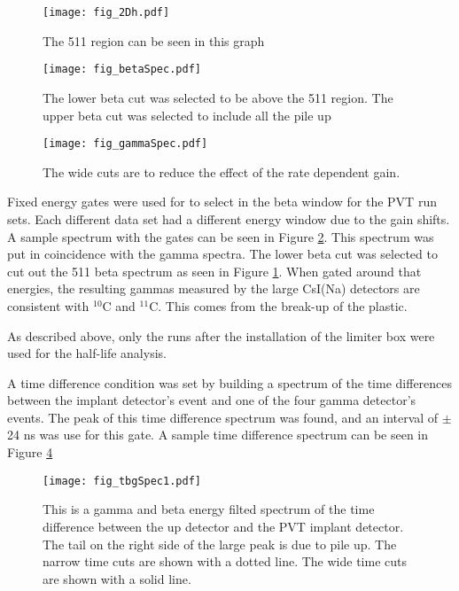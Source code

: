 \begin{figure}[!htb]
	\centerline{\texttt{[image: fig\_2Dh.pdf]}}
	\caption{The 511 region can be seen in this graph}
	\label{fig:2DGraph}
\end{figure}

\begin{figure}[!htb]
	\centerline{\texttt{[image: fig\_betaSpec.pdf]}}
	\caption{The lower beta cut was selected to be above the 511 region.
		 The upper beta cut was selected to include all the pile up}
	
	\label{fig:BetaGraph}
\end{figure}

\begin{figure}[!htb]
	\centerline{\texttt{[image: fig\_gammaSpec.pdf]}}
	\caption{The wide cuts are to reduce the effect of the rate dependent gain.}
	\label{fig:GammaGraph}
\end{figure}

Fixed energy gates were used for to select in the beta window for the PVT run sets.
Each different data set had a different energy window due to the gain shifts.
A sample spectrum with the gates can be seen in Figure \ref{fig:BetaGraph}.
This spectrum was put in coincidence with the gamma spectra. 
The lower beta cut was selected to cut out the 511 beta spectrum as seen in Figure \ref{fig:2DGraph}.
When gated around that energies, the resulting gammas measured by the large CsI(Na) detectors are consistent with $^{10}$C and $^{11}$C.
This comes from the break-up of the plastic. 

As described above, only the runs after the installation of the limiter box were used for the half-life analysis. 

A time difference condition was set by building a spectrum of the time differences between the implant detector's event and one of the four gamma detector's events. 
The peak of this time difference spectrum was found, and an interval of $\pm$24 ns  was use for this gate.
A sample time difference spectrum can be seen in Figure \ref{fig:timediff}

\begin{figure}
	\centerline{\texttt{[image: fig\_tbgSpec1.pdf]}}	
	\caption{This is a gamma and beta energy filted spectrum of the time difference between the up detector and the PVT implant detector.
		The tail on the right side of the large peak is due to pile up.
		The narrow time cuts are shown with a dotted line.
		The wide time cuts are shown with a solid line.}
	\label{fig:timediff}
\end{figure}

